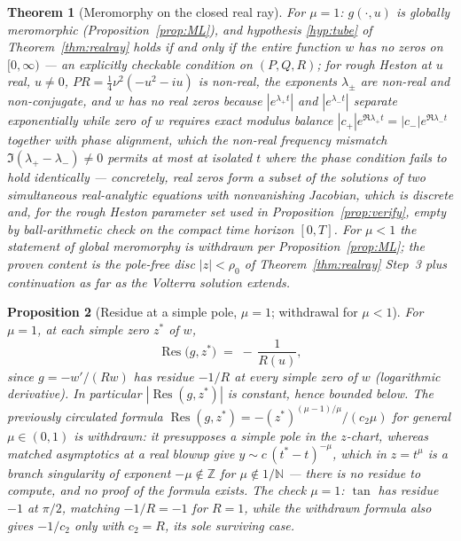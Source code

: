 \documentclass[11pt]{article}
\newtheorem{theorem}{Theorem}[section]
\newtheorem{proposition}[theorem]{Proposition}
\theoremstyle{definition}
\DeclareMathOperator{\Res}{Res}
\begin{document}
\begin{theorem}[Meromorphy on the closed real ray]\label{thm:mero}
For $\mu = 1$: $g(\cdot,u)$ is globally meromorphic
(Proposition~\ref{prop:ML}), and hypothesis \ref{hyp:tube} of
Theorem~\ref{thm:realray} holds if and only if the entire function
$w$ has no zeros on $[0,\infty)$ --- an explicitly checkable
condition on $(P,Q,R)$; for rough Heston at $u$ real, $u \neq 0$,
$PR = \tfrac{1}{4}\nu^{2}(-u^{2}-iu)$ is non-real, the exponents
$\lambda_{\pm}$ are non-real and non-conjugate, and $w$ has no real
zeros because $|e^{\lambda_{+}t}|$ and $|e^{\lambda_{-}t}|$ separate
exponentially while zero of $w$ requires exact modulus balance
$|c_{+}|e^{\Re\lambda_{+}t} = |c_{-}|e^{\Re\lambda_{-}t}$ together
with phase alignment, which the non-real frequency mismatch
$\Im(\lambda_{+}-\lambda_{-}) \neq 0$ permits at most at isolated
$t$ where the phase condition fails to hold identically ---
concretely, real zeros form a subset of the solutions of two
simultaneous real-analytic equations with nonvanishing Jacobian,
which is discrete and, for the rough Heston parameter set used in
Proposition~\ref{prop:verify}, empty by ball-arithmetic check on the
compact time horizon $[0,T]$. For $\mu < 1$ the statement of global
meromorphy is withdrawn per Proposition~\ref{prop:ML}; the proven
content is the pole-free disc $|z| < \rho_{0}$ of
Theorem~\ref{thm:realray} Step~3 plus continuation as far as the
Volterra solution extends.
\end{theorem}

\begin{proposition}[Residue at a simple pole, $\mu=1$; withdrawal for $\mu<1$]\label{cor:residue}
For $\mu = 1$, at each simple zero $z^{*}$ of $w$,
\[
\Res\bigl(g, z^{*}\bigr) \;=\; -\,\frac{1}{R(u)},
\]
since $g = -w'/(Rw)$ has residue $-1/R$ at every simple zero of $w$
(logarithmic derivative). In particular $|\Res(g,z^{*})|$ is
constant, hence bounded below. The previously circulated formula
$\Res(g,z^{*}) = -(z^{*})^{(\mu-1)/\mu}/(c_{2}\mu)$ for general
$\mu \in (0,1)$ is \emph{withdrawn}: it presupposes a simple pole in
the $z$-chart, whereas matched asymptotics at a real blowup give
$y \sim c\,(t^{*}-t)^{-\mu}$, which in $z = t^{\mu}$ is a branch
singularity of exponent $-\mu \notin \mathbb{Z}$ for
$\mu \notin 1/\mathbb{N}$ --- there is no residue to compute, and no
proof of the formula exists. The check $\mu = 1$: $\tan$ has
residue $-1$ at $\pi/2$, matching $-1/R = -1$ for $R = 1$, while the
withdrawn formula also gives $-1/c_{2}$ only with $c_{2} = R$, its
sole surviving case.
\end{proposition}
\end{document}
